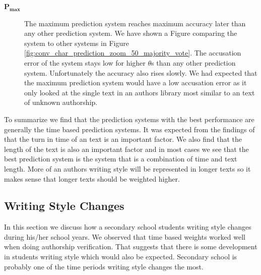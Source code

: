 \begin{description}
    \item[$\mathbf{P_{max}}$]

        The maximum prediction system reaches maximum accuracy
        later than any other prediction system. We have shown a
        Figure comparing the system to other systems in Figure
        \ref{fig:conv_char_prediction_zoom_50_majority_vote}. The accusation
        error of the system stays low for higher $\theta$s than any other
        prediction system. Unfortunately the accuracy also rises slowly. We had
        expected that the maximum prediction system would have a low accusation
        error as it only looked at the single text in an authors library most
        similar to an text of unknown authorship.

\end{description}

To summarize we find that the prediction systems with the best performance are
generally the time based prediction systems. It was expected from the findings
of \citet{hansen2014} that the turn in time of an text is an important factor.
We also find that the length of the text is also an important factor and in most
cases we see that the best prediction system is the system that is a combination
of time and text length. More of an authors writing style will be represented in
longer texts so it makes sense that longer texts should be weighted higher.


\subsection{Writing Style Changes}
\label{subsec:writing_style_changes}

In this section we discuss how a secondary school students writing style changes
during his/her school years. We observed that time based weights worked well
when doing authorship verification. That suggests that there is some development
in students writing style which would also be expected. Secondary school is
probably one of the time periods writing style changes the most.

